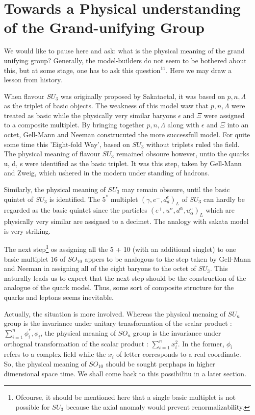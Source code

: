 \section{Towards a Physical understanding of the Grand-unifying Group}

We would like to pause here and ask: what is the physical meaning of the grand unifying group? Generally, the model-builders do not seem to be bothered about this, but at some stage, one has to ask this question$^{11}$. Here we may draw a lesson from history.

When flavour $SU_{3}$ was originally proposed by Sakataetal, it was based on $p, n, \Lambda $ as the triplet of basic objects. The weakness of this model waw that $p, n, \Lambda$ were treated as basic while the physically very similar baryons $\epsilon$ and $\Xi$ were assigned to a composite multiplet. By bringing together $p, n , \Lambda$ along with $\epsilon$ and $\Xi$ into an octet, Gell-Mann and Neeman construcuted the more successfull model. For quite some time this 'Eight-fold Way', based on $SU_{3}$ without triplets ruled the field. The physical meaning of flavour $SU_{3}$ remained obsoure however, untio the quarks u, d, s were identified as the basic triplet. It was this step, taken by Gell-Mann and Zweig, which ushered in the modern under standing of hadrons.

Similarly, the physical meaning of $SU_{3}$ may remain obsoure, until the basic quintet of $SU_{3}$ is identified. The $5^{*}$ multiplet $(\gamma, e^{-}, d^{c}_{d})_{L}$ of $SU_{3}$ can  hardly be regarded as the basic quintet since the particles $(e^{+}, u^{\alpha}, d^{\alpha}, u^{c}_{\alpha})_{L}$ which are physically very similar are  assigned to a decimet. The analogy with sakata model is very striking.

The next step\footnote{Ofcourse, it should be mentioned here that a single basic multiplet is not possible for $SU_{3}$ because the axial anomaly would prevent renormalizability.} os assigning all the 5 + 10 (with an additional singlet) to one basic multiplet 16 of $SO_{10}$ appers to be analogous to the step taken by Gell-Mann and Neeman in assigning all of the eight baryons to the octet of $SU_{3}$. This naturally leads us to expect that the next step should be the construction of the analogue of the quark model. Thus, some sort of composite structure for the quarks and leptons seems inevitable.

Actually, the situation is more involved. Whereas the physical mena\-ing of $SU_{n}$ group is the invariance under unitary trnasformation of the scalar product : $\sum^{n}_{i=1} \phi^{*}_{i}, \phi_{i}$, the physical meaning of $SO_{n}$ group is the invariance under orthognal transformation of the scalar product : $\sum_{i=1}^{n} x^{2}_{i}$. In the former, $\phi_{i}$ refers to a complex field while the $x_{i}$ of letter corresponds to a real coordinate. So, the physical meaning of $SO_{10}$ should be sought perphaps in higher dimensional space time. We shall come back to this possibilitu in a later section.

